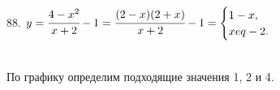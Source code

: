 88. $y=\cfrac{4-x^2}{x+2}-1=\cfrac{(2-x)(2+x)}{x+2}-1=\begin{cases} 1-x,\\ x
eq-2.\end{cases}$\\
\begin{figure}[ht!]
\end{figure}\\
По графику определим подходящие значения 1, 2 и 4.\\
